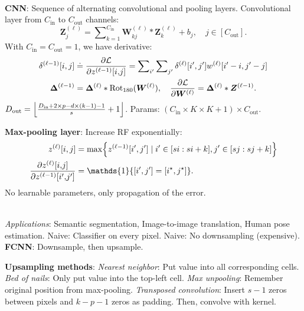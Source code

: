 \documentclass{article}
\newcommand{\lft}{\mathopen{}\mathclose\bgroup\left}
\newcommand{\rgt}{\aftergroup\egroup\right}
\newcommand{\mat}[1]{\bm{#1}}
\newenvironment{topic}[1]
{\textbf{\sffamily \colorbox{black}{\rlap{\textbf{\textcolor{white}{#1}}}\hspace{\linewidth}\hspace{-2\fboxsep}}} \\ \vspace{0.2cm}}
{}
\begin{document}
\begin{multicols*}{2}
\begin{topic}{Convolutional neural networks}
        \textbf{CNN}: Sequence of alternating convolutional and pooling layers. Convolutional layer from $C_{\mathrm{in}}$ to $C_{\mathrm{out}}$ channels: \[
            \mat{Z}_j^{(\ell)} = \sum\nolimits_{k=1}^{C_{\mathrm{in}}} \mat{W}_{kj}^{(\ell)} * \mat{Z}_k^{(\ell)} + b_j, \quad j \in [C_{\mathrm{out}}].
        \]
        With $C_{\mathrm{in}} = C_{\mathrm{out}} = 1$, we have derivative:
        \begin{gather*}
            \delta^{(\ell-1)}[i,j] \doteq \pdv{\mathcal{L}}{z^{(\ell-1)}[i{,}j]} = \sum\nolimits_{i'} \sum\nolimits_{j'} \delta^{(\ell)}[i',j'] w^{(\ell)}[i'-i,j'-j] \\
            \mat{\Delta}^{(\ell-1)} = \mat{\Delta}^{(\ell)} * \mathrm{Rot}_{180}(\mat{W}^{(\ell)}), \quad \pdv{\mathcal{L}}{\mat{W}^{(\ell)}} = \mat{\Delta}^{(\ell)} * \mat{Z}^{(\ell - 1)}.
        \end{gather*}
        $D_{\mathrm{out}} = \lft\lfloor \frac{D_{\mathrm{in}} + 2 \times p - d \times (k - 1) - 1}{s} + 1 \rgt\rfloor$.
        Params: $(C_{\mathrm{in}} \times K \times K + 1) \times C_{\mathrm{out}}$.

        \textbf{Max-pooling layer}: Increase RF exponentially:
        \begin{align*}
            z^{(\ell)}[i,j]                                & = \max \lft\{ z^{(\ell-1)}[i',j'] \mid i' \in [si : si + k], j' \in [sj : sj+k] \rgt\} \\
            \pdv{z^{(\ell)}[i{,}j]}{z^{(\ell-1)}[i'{,}j']} & = \mathds{1}\{ [i',j'] = [i^\star,j^\star] \}.
        \end{align*}
        No learnable parameters, only propagation of the error.
    \end{topic}

    \begin{topic}{Fully convolutional neural networks}
        \textit{Applications}: Semantic segmentation, Image-to-image translation, Human pose
        estimation. Naive: Classifier on every pixel. Naive: No downsampling (expensive).
        \textbf{FCNN}: Downsample, then upsample.

        \textbf{Upsampling methods}: \textit{Nearest neighbor}: Put value into all corresponding cells.
        \textit{Bed of nails}: Only put value into the top-left cell.
        \textit{Max unpooling}: Remember original position from max-pooling.
        \textit{Transposed convolution}: Insert $s-1$ zeros between pixels and $k-p-1$ zeros as padding. Then, convolve with kernel.


\end{topic}
\end{multicols*}
\end{document}
